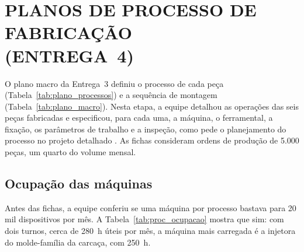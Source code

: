 \section[PLANOS DE PROCESSO DE FABRICAÇÃO (ENTREGA 4)]{PLANOS DE PROCESSO DE FABRICAÇÃO\\(ENTREGA~4)}\label{sec:planos_processo}


O plano macro da Entrega~3 definiu o processo de cada peça (Tabela~\ref{tab:plano_processos}) e a sequência de montagem (Tabela~\ref{tab:plano_macro}). Nesta etapa, a equipe detalhou as operações das seis peças fabricadas e especificou, para cada uma, a máquina, o ferramental, a fixação, os parâmetros de trabalho e a inspeção, como pede o planejamento do processo no projeto detalhado \cite{rozenfeld2006gestao}. As fichas consideram ordens de produção de 5.000 peças, um quarto do volume mensal.

\subsection{Ocupação das máquinas}
\label{subsec:proc_ocupacao}

Antes das fichas, a equipe conferiu se uma máquina por processo bastava para 20 mil dispositivos por mês. A Tabela~\ref{tab:proc_ocupacao} mostra que sim: com dois turnos, cerca de 280~h úteis por mês, a máquina mais carregada é a injetora do molde-família da carcaça, com 250~h.

